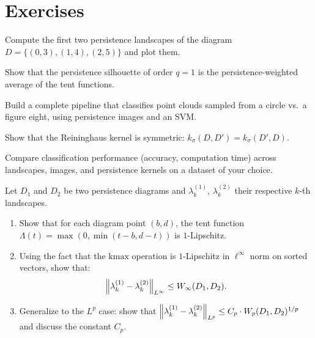 \section{Exercises}

\begin{exercise}
Compute the first two persistence landscapes of the diagram
$D = \{(0, 3), (1, 4), (2, 5)\}$ and plot them.
\end{exercise}

\begin{exercise}
Show that the persistence silhouette of order $q = 1$ is the
persistence-weighted average of the tent functions.
\end{exercise}

\begin{exercise}[Implementation]
Build a complete pipeline that classifies point clouds sampled
from a circle vs.\ a figure eight, using persistence images
and an SVM.
\end{exercise}

\begin{exercise}
Show that the Reininghaus kernel is symmetric:
$k_\sigma(D, D') = k_\sigma(D', D)$.
\end{exercise}

\begin{exercise}
Compare classification performance (accuracy, computation time)
across landscapes, images, and persistence kernels on a dataset
of your choice.
\end{exercise}

\begin{exercise}
Let $D_1$ and $D_2$ be two persistence diagrams and
$\lambda_k^{(1)}$, $\lambda_k^{(2)}$ their respective $k$-th landscapes.
\begin{enumerate}
  \item Show that for each diagram point $(b, d)$, the tent function
        $\Lambda(t) = \max(0, \min(t - b, d - t))$ is $1$-Lipschitz.
  \item Using the fact that the $\mathrm{kmax}$ operation is
        $1$-Lipschitz in $\ell^\infty$ norm on sorted vectors, show that:
        \[
          \left\| \lambda_k^{(1)} - \lambda_k^{(2)} \right\|_{L^\infty}
          \leq W_\infty(D_1, D_2).
        \]
  \item Generalize to the $L^p$ case: show that
        $\left\| \lambda_k^{(1)} - \lambda_k^{(2)} \right\|_{L^p}
        \leq C_p \cdot W_p(D_1, D_2)^{1/p}$
        and discuss the constant $C_p$.
\end{enumerate}
\end{exercise}

